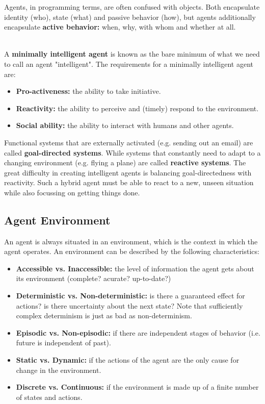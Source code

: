 \documentclass[12pt]{article}
\begin{document}
\noindent
Agents, in programming terms, are often confused with objects.
Both encapsulate identity (who), state (what) and passive behavior (how), but agents additionally encapsulate \textbf{active behavior:} when, why, with whom and whether at all.

\noindent
\\
A \textbf{minimally intelligent agent} is known as the bare minimum of what we need to call an agent "intelligent".
The requirements for a minimally intelligent agent are:

\begin{itemize}
    \item \textbf{Pro-activeness:} the ability to take initiative.
    \item \textbf{Reactivity:} the ability to perceive and (timely) respond to the environment.
    \item \textbf{Social ability:} the ability to interact with humans and other agents.
\end{itemize}

\noindent
Functional systems that are externally activated (e.g. sending out an email) are called \textbf{goal-directed systems}.
While systems that constantly need to adapt to a changing environment (e.g. flying a plane) are called \textbf{reactive systems}.
The great difficulty in creating intelligent agents is balancing goal-directedness with reactivity.
Such a hybrid agent must be able to react to a new, unseen situation while also focussing on getting things done.

\subsection{Agent Environment}
An agent is always situated in an environment, which is the context in which the agent operates.
An environment can be described by the following characteristics:

\begin{itemize}
    \item \textbf{Accessible vs. Inaccessible:} the level of information the agent gets about its environment (complete? acurate? up-to-date?)
    \item \textbf{Deterministic vs. Non-deterministic:} is there a guaranteed effect for actions? is there uncertainty about the next state? Note that sufficiently complex determinism is just as bad as non-determinism.
    \item \textbf{Episodic vs. Non-episodic:} if there are independent stages of behavior (i.e. future is independent of past).
    \item \textbf{Static vs. Dynamic:} if the actions of the agent are the only cause for change in the environment.
    \item \textbf{Discrete vs. Continuous:} if the environment is made up of a finite number of states and actions.
\end{itemize}
\end{document}
